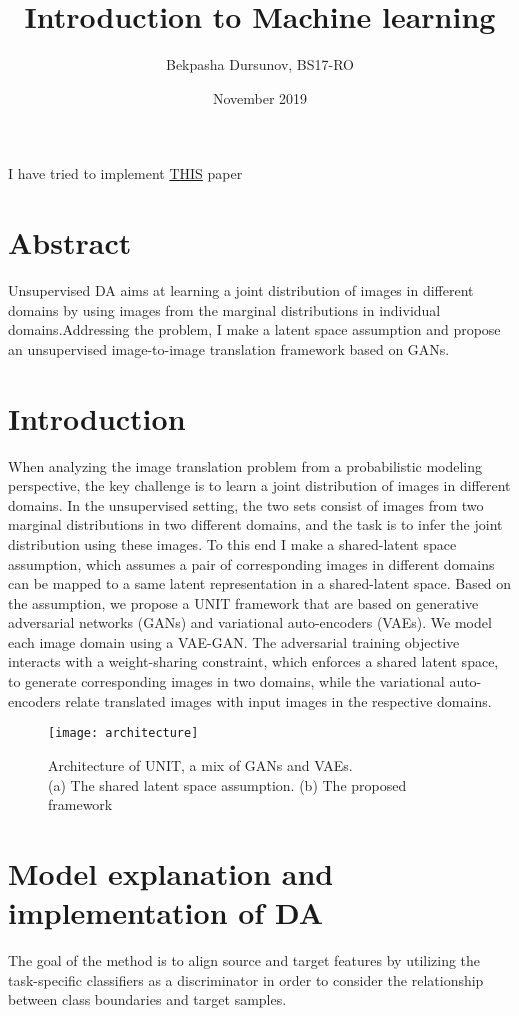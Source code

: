 \documentclass{article}
\title{Introduction to Machine learning}
\author{Bekpasha Dursunov, BS17-RO }
\date{November 2019}
\begin{document}
\maketitle
I have tried to implement \href{https://arxiv.org/pdf/1702.08400.pdf}{THIS} paper

\section*{Abstract}
Unsupervised DA aims at learning a joint distribution of
images in different domains by using images from the marginal distributions in
individual domains.Addressing the problem, I make a latent space assumption and propose an unsupervised image-to-image translation framework based on GANs.
\tableofcontents{}

\section{Introduction}
When analyzing the image translation problem from a probabilistic modeling perspective, the key
challenge is to learn a joint distribution of images in different domains. In the unsupervised setting,
the two sets consist of images from two marginal distributions in two different domains, and the task is
to infer the joint distribution using these images.
To this end I make a shared-latent space assumption, which assumes a pair of corresponding images
in different domains can be mapped to a same latent representation in a shared-latent space.\citep{four} Based on
the assumption, we propose a UNIT framework that are based on generative adversarial networks
(GANs) and variational auto-encoders (VAEs). We model each image domain using a VAE-GAN. The
adversarial training objective interacts with a weight-sharing constraint, which enforces a shared latent space, to generate corresponding images in two domains, while the variational auto-encoders
relate translated images with input images in the respective domains.
\begin{figure}[h!]
\centering
\texttt{[image: architecture]}
\caption{\citep{three}Architecture of UNIT, a mix of GANs and VAEs. \\
(a) The shared latent space assumption. (b) The proposed framework}
\label{fig:architecture}
\end{figure}


\section{Model explanation and implementation of DA}
 The goal of the method is to align source and target features by utilizing the task-specific classifiers as a discriminator in order to consider the relationship between class
boundaries and target samples.\citep{five}
 
\end{document}
